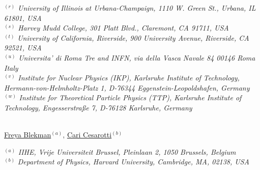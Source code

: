 {\begin{center}
$^{(r)}$ \emph{University of Illinois at Urbana-Champaign, 1110 W. Green St., Urbana, IL 61801, USA}\\
$^{(s)}$ \emph{Harvey Mudd College, 301 Platt Blvd., Claremont, CA 91711, USA}\\
$^{(t)}$ \emph{University of California, Riverside, 900 University Avenue, Riverside, CA 92521, USA}\\
$^{(u)}$ \emph{Universita' di Roma Tre and INFN, via della Vasca Navale 84 00146 Roma Italy}\\
$^{(v)}$ \emph{Institute for Nuclear Physics (IKP), Karlsruhe Institute of Technology, Hermann-von-Helmholtz-Platz 1, D-76344 Eggenstein-Leopoldshafen, Germany}\\
$^{(w)}$ \emph{Institute for Theoretical Particle Physics (TTP), Karlsruhe Institute of Technology, Engesserstra{\ss}e 7, D-76128 Karlsruhe, Germany}
\end{center}}


\vspace{0.25cm}

\\

\noindent\href{mailto:freya.blekman@cern.ch}{Freya Blekman}$^{(a)}$,
\noindent\href{mailto:ccesarotti@g.harvard.edu}{Cari Cesarotti}$^{(b)}$\\

\vspace{0.25cm}

{\footnotesize
\begin{center}
$^{(a)}$ \emph{IIHE, Vrije Universiteit Brussel, Pleinlaan 2, 1050 Brussels, Belgium}\\
$^{(b)}$ \emph{Department of Physics, Harvard University, Cambridge, MA, 02138, USA}
\end{center}}